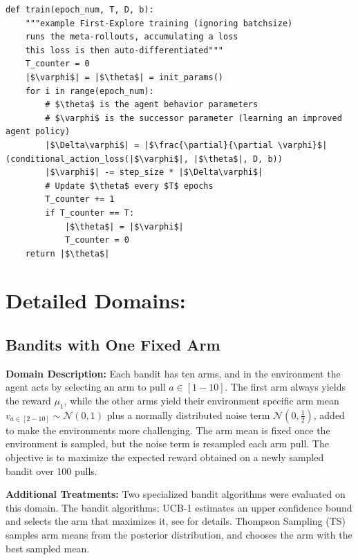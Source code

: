 \documentclass{article}
\begin{document}
\renewcommand{\listingscaption}{Algorithm}
\begin{listing}[h]
\begin{verbatim}
def train(epoch_num, T, D, b):
    """example First-Explore training (ignoring batchsize)
    runs the meta-rollouts, accumulating a loss
    this loss is then auto-differentiated"""
    T_counter = 0
    |$\varphi$| = |$\theta$| = init_params()
    for i in range(epoch_num):
        # $\theta$ is the agent behavior parameters
        # $\varphi$ is the successor parameter (learning an improved agent policy)
        |$\Delta\varphi$| = |$\frac{\partial}{\partial \varphi}$|(conditional_action_loss(|$\varphi$|, |$\theta$|, D, b))
        |$\varphi$| -= step_size * |$\Delta\varphi$|
        # Update $\theta$ every $T$ epochs
        T_counter += 1
        if T_counter == T:
            |$\theta$| = |$\varphi$|
            T_counter = 0
    return |$\theta$|
\end{verbatim}
\caption{Example of Training First-Explore using the Cross-Entropy loss and Auto-Differentiation.}
\label{listing:trainfe2}
\end{listing}

\FloatBarrier
\clearpage
\pagebreak

\section{Detailed Domains:}
\label{dom_deet}

\subsection{Bandits with One Fixed Arm} \label{bandit_env}

\FloatBarrier

\textbf{Domain Description:} Each bandit has ten arms, and in the environment the agent acts by selecting an arm to pull \(a\in[1-10]\). The first arm always yields the reward \(\mu_1\), while the other arms yield their environment specific arm mean \(v_{a\in[2-10]} \sim \mathcal{N}(0, 1)\) plus a normally distributed noise term \(\mathcal{N}(0, \frac{1}{2})\), added to make the environments more challenging. The arm mean is fixed once the environment is sampled, but the noise term is resampled each arm pull. The objective is to maximize the expected reward obtained on a newly sampled bandit over 100 pulls.

\textbf{Additional Treatments:} Two specialized bandit algorithms were evaluated on this domain. The bandit algorithms: UCB-1 estimates an upper confidence bound and selects the arm that maximizes it, see  for details. Thompson Sampling (TS) \citep{TS} samples arm means from the posterior distribution, and chooses the arm with the best sampled mean.
\end{document}
